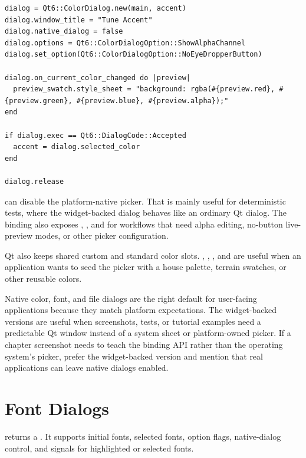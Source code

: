 
\begin{lstlisting}[style=crystal]
dialog = Qt6::ColorDialog.new(main, accent)
dialog.window_title = "Tune Accent"
dialog.native_dialog = false
dialog.options = Qt6::ColorDialogOption::ShowAlphaChannel
dialog.set_option(Qt6::ColorDialogOption::NoEyeDropperButton)

dialog.on_current_color_changed do |preview|
  preview_swatch.style_sheet = "background: rgba(#{preview.red}, #{preview.green}, #{preview.blue}, #{preview.alpha});"
end

if dialog.exec == Qt6::DialogCode::Accepted
  accent = dialog.selected_color
end

dialog.release
\end{lstlisting}

 can disable the platform-native picker. That is mainly useful for deterministic tests, where the widget-backed dialog behaves like an ordinary Qt dialog. The binding also exposes , , and  for workflows that need alpha editing, no-button live-preview modes, or other picker configuration.

Qt also keeps shared custom and standard color slots. , , , and  are useful when an application wants to seed the picker with a house palette, terrain swatches, or other reusable colors.

Native color, font, and file dialogs are the right default for user-facing applications because they match platform expectations. The widget-backed versions are useful when screenshots, tests, or tutorial examples need a predictable Qt window instead of a system sheet or platform-owned picker. If a chapter screenshot needs to teach the binding API rather than the operating system's picker, prefer the widget-backed version and mention that real applications can leave native dialogs enabled.

\section{Font Dialogs}

 returns a . It supports initial fonts, selected fonts, option flags, native-dialog control, and signals for highlighted or selected fonts.

